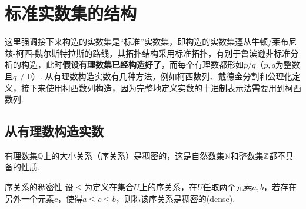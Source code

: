 \documentclass[main.tex]{subfiles}
\begin{document}
\section{标准实数集的结构}

这里强调接下来构造的实数集是“标准”实数集，即构造的实数集遵从牛顿/莱布尼兹-柯西-魏尔斯特拉斯的路线，其拓扑结构采用标准拓扑，有别于鲁滨逊非标准分析的构造，此时\textbf{假设有理数集已经构造好了}，而每个有理数都形如\(p/q\)（\(p,q\)为整数且\(q \neq 0\)）. 从有理数构造实数有几种方法，例如柯西数列、戴德金分割和公理化定义，接下来使用柯西数列构造，因为完整地定义实数的十进制表示法需要用到柯西数列.


\subsection{从有理数构造实数}

有理数集\(\mathbb{Q}\)上的大小关系（序关系）是稠密的，这是自然数集\(\mathbb{N}\)和整数集\(\mathbb{Z}\)都不具备的性质.

\begin{definition}{序关系的稠密性}
    设\(\leq\)为定义在集合\(U\)上的序关系，在\(U\)任取两个元素\(a,b\)，若存在另外一个元素\(c\)，使得\(a\leq c \leq b\)，则称该序关系是\uline{稠密的}(dense).
\end{definition}
\end{document}
